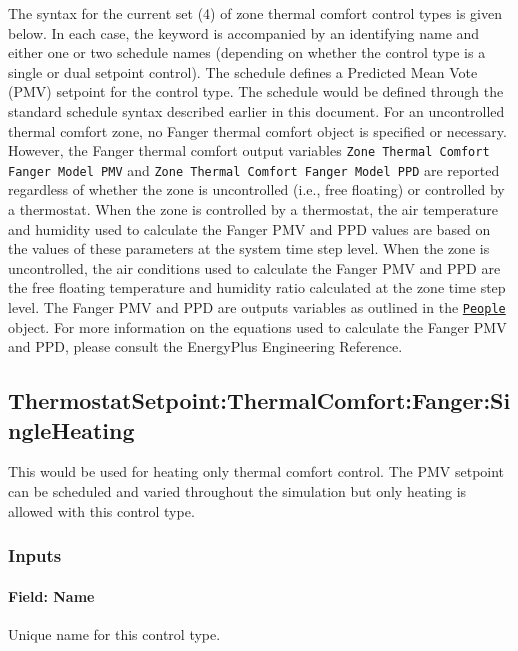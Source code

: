 The syntax for the current set (4) of zone thermal comfort control types is given below. In each case, the keyword is accompanied by an identifying name and either one or two schedule names (depending on whether the control type is a single or dual setpoint control). The schedule defines a Predicted Mean Vote (PMV) setpoint for the control type. The schedule would be defined through the standard schedule syntax described earlier in this document. For an uncontrolled thermal comfort zone, no Fanger thermal comfort object is specified or necessary. However, the Fanger thermal comfort output variables \lstinline!Zone Thermal Comfort Fanger Model PMV! and \lstinline!Zone Thermal Comfort Fanger Model PPD! are reported regardless of whether the zone is uncontrolled (i.e., free floating) or controlled by a thermostat. When the zone is controlled by a thermostat, the air temperature and humidity used to calculate the Fanger PMV and PPD values are based on the values of these parameters at the system time step level.  When the zone is uncontrolled, the air conditions used to calculate the Fanger PMV and PPD are the free floating temperature and humidity ratio calculated at the zone time step level. The Fanger PMV and PPD are outputs variables as outlined in the \hyperref[people]{\lstinline!People!} object. For more information on the equations used to calculate the Fanger PMV and PPD, please consult the EnergyPlus Engineering Reference.

\subsection{ThermostatSetpoint:ThermalComfort:Fanger:SingleHeating}\label{thermostatsetpointthermalcomfortfangersingleheating}

This would be used for heating only thermal comfort control. The PMV setpoint can be scheduled and varied throughout the simulation but only heating is allowed with this control type.

\subsubsection{Inputs}\label{inputs-10-023}

\paragraph{Field: Name}\label{field-name-8-024}

Unique name for this control type.

